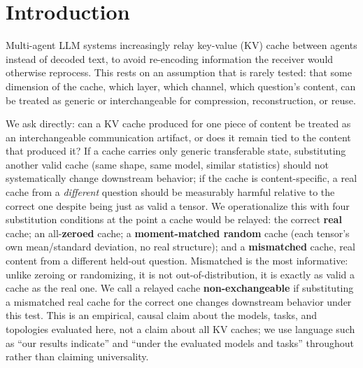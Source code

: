 \documentclass[11pt]{article}
\begin{document}
\section{Introduction}

Multi-agent LLM systems increasingly relay key-value (KV) cache between
agents instead of decoded text, to avoid re-encoding information the
receiver would otherwise reprocess. This rests on an assumption that is
rarely tested: that some dimension of the cache, which layer, which
channel, which question's content, can be treated as generic or
interchangeable for compression, reconstruction, or reuse.

We ask directly: can a KV cache produced for one piece of content be
treated as an interchangeable communication artifact, or does it
remain tied to the content that produced it? If a cache carries only
generic transferable state, substituting another valid cache (same
shape, same model, similar statistics) should not systematically change
downstream behavior; if the cache is content-specific, a real cache
from a \emph{different} question should be measurably harmful relative
to the correct one despite being just as valid a tensor. We
operationalize this with four substitution conditions at the point a
cache would be relayed: the correct \textbf{real} cache; an
all-\textbf{zeroed} cache; a \textbf{moment-matched random} cache
(each tensor's own mean/standard deviation, no real structure); and a
\textbf{mismatched} cache, real content from a different held-out
question. Mismatched is the most informative: unlike zeroing or
randomizing, it is not out-of-distribution, it is exactly as valid a
cache as the real one. We call a relayed cache \textbf{non-exchangeable}
if substituting a mismatched real cache for the correct one changes
downstream behavior under this test. This is an empirical, causal claim
about the models, tasks, and topologies evaluated here, not a claim
about all KV caches; we use language such as ``our results indicate''
and ``under the evaluated models and tasks'' throughout rather than
claiming universality.
\end{document}

